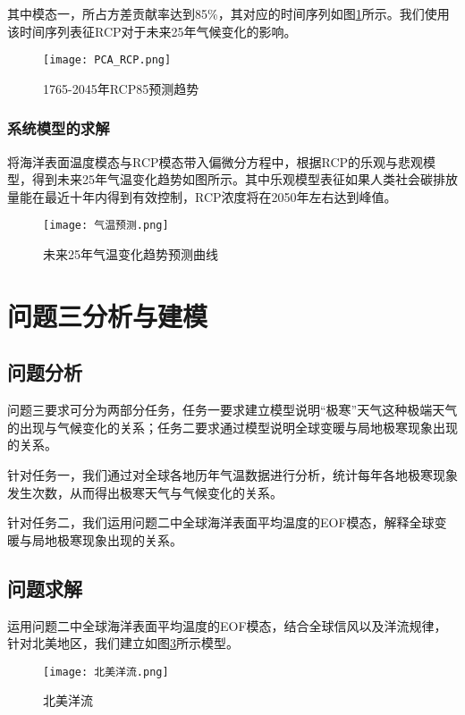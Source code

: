 \documentclass[bwprint]{gmcmthesis}
\begin{document}
其中模态一，所占方差贡献率达到85\%，其对应的时间序列如图\ref{PCA_RCP}所示。我们使用该时间序列表征RCP对于未来25年气候变化的影响。

\begin{figure}[!h]
\centering
\texttt{[image: PCA\_RCP.png]}
\caption{1765-2045年RCP85预测趋势}\label{PCA_RCP}
\end{figure}

\subsubsection{系统模型的求解}

将海洋表面温度模态与RCP模态带入偏微分方程中，根据RCP的乐观与悲观模型，得到未来25年气温变化趋势如图所示。其中乐观模型表征如果人类社会碳排放量能在最近十年内得到有效控制，RCP浓度将在2050年左右达到峰值。

\begin{figure}[!h]
\centering
\texttt{[image: 气温预测.png]}
\caption{未来25年气温变化趋势预测曲线}\label{predict}
\end{figure}

\section{问题三分析与建模}

\subsection{问题分析}

问题三要求可分为两部分任务，任务一要求建立模型说明“极寒”天气这种极端天气的出现与气候变化的关系；任务二要求通过模型说明全球变暖与局地极寒现象出现的关系。

针对任务一，我们通过对全球各地历年气温数据进行分析，统计每年各地极寒现象发生次数，从而得出极寒天气与气候变化的关系。

针对任务二，我们运用问题二中全球海洋表面平均温度的EOF模态，解释全球变暖与局地极寒现象出现的关系。

\subsection{问题求解}

运用问题二中全球海洋表面平均温度的EOF模态，结合全球信风以及洋流规律，针对北美地区，我们建立如图\ref{na}所示模型。

\begin{figure}[ht]
\centering
\texttt{[image: 北美洋流.png]}
\caption{北美洋流}\label{na}
\end{figure}
\end{document}
